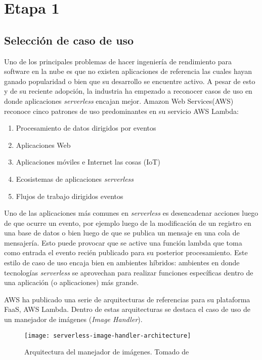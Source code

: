 \section{Etapa 1}
\subsection{Selección de caso de uso}
Uno de los principales problemas de hacer ingeniería de rendimiento para software en la nube es que no existen aplicaciones de referencia las cuales hayan ganado popularidad o bien que su desarrollo se encuentre activo. A pesar de esto y de su reciente adopción, la industria ha empezado a reconocer casos de uso en donde aplicaciones \emph{serverless} encajan mejor. Amazon Web Services(AWS)\cite{serverless-architecture-patterns} reconoce cinco patrones de uso predominantes en su servicio AWS Lambda:
\begin{enumerate}
    \item Procesamiento de datos dirigidos por eventos
    \item Aplicaciones Web
    \item Aplicaciones móviles e Internet las cosas (IoT)
    \item Ecosistemas de aplicaciones \emph{serverless}
    \item Flujos de trabajo dirigidos eventos
\end{enumerate}
 
Uno de las aplicaciones más comunes en \emph{serverless} es desencadenar acciones luego de que ocurre un evento, por ejemplo luego de la modificación de un registro en una base de datos o bien luego de que se publica un mensaje en una cola de mensajería. Esto puede provocar que se active una función lambda que toma como entrada el evento recién publicado para su posterior procesamiento. Este estilo de caso de uso encaja bien en ambientes híbridos: ambientes en donde tecnologías \emph{serverless} se aprovechan para realizar funciones específicas dentro de una aplicación (o aplicaciones) más grande.

AWS ha publicado una serie de arquitecturas de referencias\cite{aws-lambda-ref-arch} para su plataforma FaaS, AWS Lambda. Dentro de estas arquitecturas se destaca el caso de uso de un manejador de imágenes (\emph{Image Handler})\cite{aws-lambda-image-handler}. 

\begin{figure}[h]
  \centering
  \texttt{[image: serverless-image-handler-architecture]}
  \caption[Arquitectura del manejador de imágenes]{Arquitectura del manejador de imágenes. Tomado de \protect\cite{aws-lambda-image-handler}}
  \label{fig:serverless-image-handler-architecture}
\end{figure}

